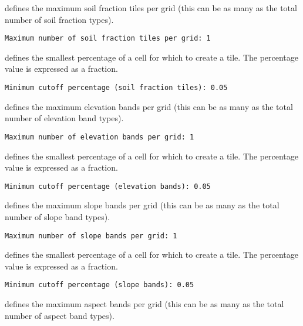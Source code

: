  
  defines the
 maximum soil fraction tiles per grid (this can be as many as the total
 number of soil fraction types). 
 

 \begin{Verbatim}[frame=single]
Maximum number of soil fraction tiles per grid: 1
 \end{Verbatim}

 
  defines the
 smallest percentage of a cell for which to create a tile.
 The percentage value is expressed as a fraction.
 

 \begin{Verbatim}[frame=single]
Minimum cutoff percentage (soil fraction tiles): 0.05
 \end{Verbatim}

 
  defines the
 maximum elevation bands per grid (this can be as many as the total
 number of elevation band types). 
 

 \begin{Verbatim}[frame=single]
Maximum number of elevation bands per grid: 1
 \end{Verbatim}

 
  defines the
 smallest percentage of a cell for which to create a tile.
 The percentage value is expressed as a fraction.
 

 \begin{Verbatim}[frame=single]
Minimum cutoff percentage (elevation bands): 0.05
 \end{Verbatim}

 
  defines the
 maximum slope bands per grid (this can be as many as the total
 number of slope band types). 
 

 \begin{Verbatim}[frame=single]
Maximum number of slope bands per grid: 1
 \end{Verbatim}

 
  defines the
 smallest percentage of a cell for which to create a tile.
 The percentage value is expressed as a fraction.
 

 \begin{Verbatim}[frame=single]
Minimum cutoff percentage (slope bands): 0.05
 \end{Verbatim}

 
  defines the
 maximum aspect bands per grid (this can be as many as the total
 number of aspect band types). 
 

